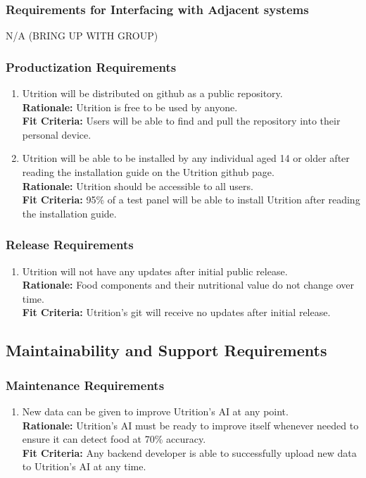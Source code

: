 \documentclass[12pt]{article}
\begin{document}
{\subsubsection{Requirements for Interfacing with Adjacent systems}
\hspace{1.5cm}N/A (BRING UP WITH GROUP) 

\subsubsection{Productization Requirements}
\begin{enumerate}[start=2,label={OE\arabic*.}]
	\item Utrition will be distributed on github as a public repository.\\
	\textbf{Rationale:} Utrition is free to be used by anyone.\\
	\textbf{Fit Criteria:} Users will be able to find and pull the repository into their personal device.
	\item Utrition will be able to be installed by any individual aged 14 or older after reading the installation guide on the Utrition github page.\\
	\textbf{Rationale:} Utrition should be accessible to all users. \\
	\textbf{Fit Criteria:} 95\% of a test panel will be able to install Utrition after reading the installation guide.
\end{enumerate}

\subsubsection{Release Requirements}

\begin{enumerate}[{OE}4. ] 
	\item Utrition will not have any updates after initial public release.\\
	\textbf{Rationale:} Food components and their nutritional value do not change over time.\\	\textbf{Fit Criteria:} Utrition’s git will receive no updates after initial release.
\end{enumerate}

\subsection{Maintainability and Support Requirements}

\subsubsection{Maintenance Requirements}
\begin{enumerate}[{MS}1. ] 
	\item New data can be given to improve Utrition’s AI at any point.\\
	\textbf{Rationale:} Utrition’s AI must be ready to improve itself whenever needed to ensure it can detect food at 70\% accuracy.\\	
	\textbf{Fit Criteria:} Any backend developer is able to successfully upload new data to Utrition’s AI at any time. 
\end{enumerate}

}
\end{document}

